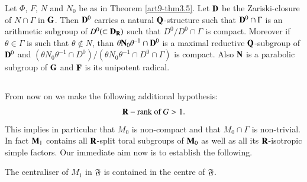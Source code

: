 \setcounter{definition}{7}
\begin{proposition}\label{art9-prop3.8}
Let $\Phi$, $F$, $N$ and $N_0$ be as in Theorem \ref{art9-thm3.5}. Let $\mathbf{D}$  be the Zariski-closure of $N \cap \Gamma$ in $\mathbf{G}$. Then $\mathbf{D}^0$ carries a natural $\mathbf{Q}$-structure such that $\mathbf{D}^0 \cap \Gamma$ is an arithmetic subgroup of $D^0 (\subset \mathbf{D}_{\mathbf{R}})$ such that $D^0/ D^0 \cap \Gamma$ is compact. Moreover if $\theta \in \Gamma$ is such that $\theta \not\in N$, than $\theta \mathbf{N}_0 \theta^{-1} \cap \mathbf{D}^0$ is a maximal reductive $\mathbf{Q}$-subgroup of $\mathbf{D}^0$ and $(\theta N_0 \theta^{-1} \cap D^0)/ (\theta N_0 \theta^{-1} \cap D^0 \cap \Gamma)$ is compact. Also $\mathbf{N}$ is a parabolic subgroup of $\mathbf{G}$ and $\mathbf{F}$ is its unipotent radical.
\end{proposition}

\setcounter{subsection}{8}
\subsection{}\label{subsec3.9}
From now on we make the following additional hypothesis:
$$
\mathbf{R}-\text{rank of } G > 1. 
$$
This implies in particular that $M_0$ is non-compact and that $M_0 \cap \Gamma$ is non-trivial. In fact $\mathbf{M}_1$ contains all $\mathbf{R}$-split toral subgroups of $\mathbf{M}_0$ as well as all its $\mathbf{R}$-isotropic simple factors. Our immediate aim now is to establish the following.

\setcounter{definition}{9}
\begin{proposition}\label{art9-prop3.10}
The centraliser of $M_1$ in $\mathfrak{F}$ is  contained in the centre of $\mathfrak{F}$.
\end{proposition}

\setcounter{subsection}{10}
